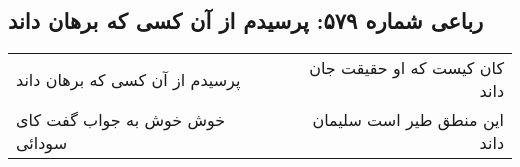 \begin{center}
\section*{رباعی شماره ۵۷۹: پرسیدم از آن کسی که برهان داند}
\label{sec:0579}
\begin{longtable}{l p{0.5cm} r}
پرسیدم از آن کسی که برهان داند
&&
کان کیست که او حقیقت جان داند
\\
خوش خوش به جواب گفت کای سودائی
&&
این منطق طیر است سلیمان داند
\\
\end{longtable}
\end{center}
